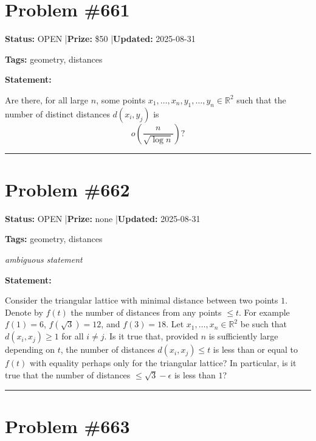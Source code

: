\documentclass{article}
\begin{document}
\section{Problem \#661}
\label{prob:661}

\noindent\textbf{Status:} OPEN \quad|\quad \textbf{Prize:} \$50 \quad|\quad \textbf{Updated:} 2025-08-31

\noindent\textbf{Tags:} geometry, distances

\medskip

\noindent\textbf{Statement:}

Are there, for all large $n$, some points $x_1,\ldots,x_n,y_1,\ldots,y_n\in \mathbb{R}^2$ such that the number of distinct distances $d(x_i,y_j)$ is\[o\left(\frac{n}{\sqrt{\log n}}\right)?\]

\noindent\rule{\linewidth}{0.4pt}


\section{Problem \#662}
\label{prob:662}

\noindent\textbf{Status:} OPEN \quad|\quad \textbf{Prize:} none \quad|\quad \textbf{Updated:} 2025-08-31

\noindent\textbf{Tags:} geometry, distances

\medskip
\noindent\textit{ambiguous statement}


\noindent\textbf{Statement:}

Consider the triangular lattice with minimal distance between two points $1$. Denote by $f(t)$ the number of distances from any points $\leq t$. For example $f(1)=6$, $f(\sqrt{3})=12$, and $f(3)=18$. Let $x_1,\ldots,x_n\in \mathbb{R}^2$ be such that $d(x_i,x_j)\geq 1$ for all $i\neq j$. Is it true that, provided $n$ is sufficiently large depending on $t$, the number of distances $d(x_i,x_j)\leq t$ is less than or equal to $f(t)$ with equality perhaps only for the triangular lattice? In particular, is it true that the number of distances $\leq \sqrt{3}-\epsilon$ is less than $1$?

\noindent\rule{\linewidth}{0.4pt}


\section{Problem \#663}
\label{prob:663}
\end{document}
